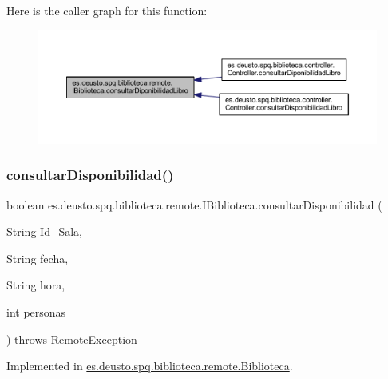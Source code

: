 Here is the caller graph for this function\+:
\nopagebreak
\begin{figure}[H]
\begin{center}
\leavevmode
\includegraphics[width=350pt]{interfacees_1_1deusto_1_1spq_1_1biblioteca_1_1remote_1_1_i_biblioteca_ae8795f9243cf23bff712d636c182193d_icgraph}
\end{center}
\end{figure}
\mbox{\label{interfacees_1_1deusto_1_1spq_1_1biblioteca_1_1remote_1_1_i_biblioteca_a96a133c2557486013949667cf0a14118}} 
\subsubsection{\texorpdfstring{consultar\+Disponibilidad()}{consultarDisponibilidad()}}
{\footnotesize\ttfamily boolean es.\+deusto.\+spq.\+biblioteca.\+remote.\+I\+Biblioteca.\+consultar\+Disponibilidad (\begin{DoxyParamCaption}\item[{String}]{Id\+\_\+\+Sala,  }\item[{String}]{fecha,  }\item[{String}]{hora,  }\item[{int}]{personas }\end{DoxyParamCaption}) throws Remote\+Exception}



Implemented in \mbox{\hyperlink{classes_1_1deusto_1_1spq_1_1biblioteca_1_1remote_1_1_biblioteca_a447029538e7996f0ea4faafff1c4351e}{es.\+deusto.\+spq.\+biblioteca.\+remote.\+Biblioteca}}.

